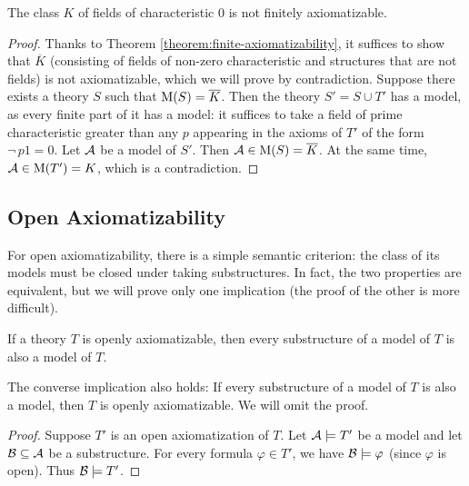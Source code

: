 \begin{proposition}
The class $K$ of fields of characteristic $0$ is not finitely axiomatizable.   
\end{proposition}
\begin{proof}
Thanks to Theorem \ref{theorem:finite-axiomatizability}, it suffices to show that $\overline{K}$ (consisting of fields of non-zero characteristic and structures that are not fields) is not axiomatizable, which we will prove by contradiction. Suppose there exists a theory $S$ such that $\operatorname{M}(S) = \overline{K}$. Then the theory 
$S' = S \cup T'$ has a model, as every finite part of it has a model: it suffices to take a field of prime characteristic greater than any $p$ appearing in the axioms of $T'$ of the form $\neg\, p1 = 0$. Let $\mathcal{A}$ be a model of $S'$. Then $\mathcal{A} \in \operatorname{M}(S) = \overline{K}$. At the same time, $\mathcal{A} \in \operatorname{M}(T') = K$, which is a contradiction.
\end{proof}

\subsection{Open Axiomatizability}

For open axiomatizability, there is a simple semantic criterion: the class of its models must be closed under taking substructures. In fact, the two properties are equivalent, but we will prove only one implication (the proof of the other is more difficult).

\begin{theorem}\label{theorem:open-axiomatizability}
If a theory $T$ is openly axiomatizable, then every substructure of a model of $T$ is also a model of $T$.   
\end{theorem}

\begin{remark}
    The converse implication also holds: If every substructure of a model of $T$ is also a model, then $T$ is openly axiomatizable. We will omit the proof.
\end{remark}

\begin{proof}
Suppose $T'$ is an open axiomatization of $T$. Let $\mathcal{A} \models T'$ be a model and let $\mathcal{B} \subseteq \mathcal{A}$ be a substructure. For every formula $\varphi \in T'$, we have $\mathcal{B} \models \varphi$ (since $\varphi$ is open). Thus $\mathcal{B} \models T'$.  
\end{proof}

